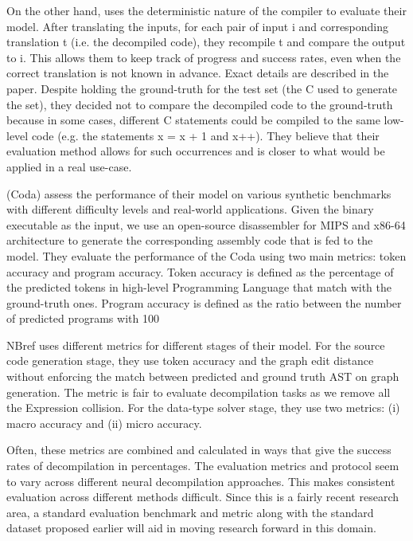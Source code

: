 \documentclass{article}
\begin{document}
On the other hand, \citet{katz2019towards} uses the deterministic nature of the compiler to evaluate their model. After translating the inputs, for each pair of input i and corresponding translation t (i.e. the decompiled code), they recompile t and compare the output to i. This allows them to keep track of progress and success rates, even when the correct translation is not known in advance. Exact details are described in the paper. Despite holding the ground-truth for the test set (the C used to generate the set), they decided not to compare the decompiled code to the ground-truth because in some cases, different C statements could be compiled to the same low-level code (e.g. the statements x = x + 1 and x++). They believe that their evaluation method allows for such occurrences and is closer to what would be applied in a real use-case.

\citet{coda} (Coda) assess the performance of their model on various synthetic benchmarks with different difficulty levels and real-world applications. Given the binary executable as the input, we use an open-source disassembler \cite{mips,redasm} for MIPS \cite{hennessy1982mips} and x86-64 \cite{guide2011intel} architecture to generate the corresponding assembly code that is fed to the model. They evaluate the performance of the Coda using two main metrics: token accuracy and program accuracy. Token accuracy is defined as the percentage of the predicted tokens in high-level Programming Language that match with the ground-truth ones. Program accuracy is defined as the ratio between the number of predicted programs with 100%

NBref \cite{nbref} uses different metrics for different stages of their model. For the source code generation stage, they use token accuracy and the graph edit distance \cite{sanfeliu1983distance} without enforcing the match between predicted and ground truth AST on graph generation. The metric is fair to evaluate decompilation tasks as we remove all the Expression collision. For the data-type solver stage, they use two metrics: (i) macro accuracy and (ii) micro accuracy.

Often, these metrics are combined and calculated in ways that give the success rates of decompilation in percentages. The evaluation metrics and protocol seem to vary across different neural decompilation approaches. This makes consistent evaluation across different methods difficult. Since this is a fairly recent research area, a standard evaluation benchmark and metric along with the standard dataset proposed earlier will aid in moving research forward in this domain.
\end{document}
